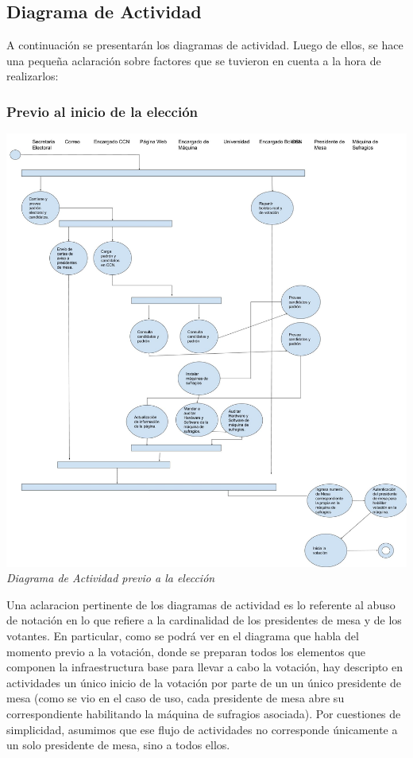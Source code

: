 \documentclass[spanish, 10pt,a4paper]{article}
\numberwithin{equation}{section} %
\begin{document}
\subsection{Diagrama de Actividad}
A continuación se presentarán los diagramas de actividad. Luego de ellos, se hace una pequeña aclaración sobre factores que se tuvieron en cuenta a la hora de realizarlos:

\subsubsection{Previo al inicio de la elección}

\vspace{\baselineskip}
    \begin{center}
                \includegraphics[scale=0.25]{imagenes/actividad/PreVotacion.jpg}
                \\
                \vspace{1pt}
                \footnotesize\textit{Diagrama de Actividad previo a la elección}
        \end{center}
\vspace{\baselineskip}


Una aclaracion pertinente de los diagramas de actividad es lo referente al abuso de notación en lo que refiere a la cardinalidad de los presidentes de mesa y de los votantes. En particular, como se podrá ver en el diagrama que habla del momento previo a la votaci\'on, donde se preparan todos los elementos que componen la infraestructura base para llevar a cabo la votaci\'on, hay descripto en actividades un \'unico inicio de la votaci\'on por parte de un un único presidente de mesa (como se vio en el caso de uso, cada presidente de mesa abre su correspondiente habilitando la m\'aquina de sufragios asociada). Por cuestiones de simplicidad, asumimos que ese flujo de actividades no corresponde únicamente a un solo presidente de mesa, sino a todos ellos.
\end{document}

